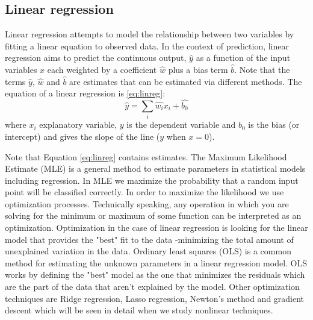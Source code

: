 \documentclass[11pt]{article}
\begin{document}
\subsection{Linear regression}
\label{sse:linreg}

Linear regression attempts to model the relationship between two variables by fitting a linear equation to observed data. In the context of prediction, linear regression aims to predict the continuous output, $\hat{y}$ as a function of the input variables $x$ each weighted by a coefficient $\hat{w}$ plus a bias term $\hat{b}$. Note that the terms $\hat{y}$, $\hat{w}$ and $\hat{b}$ are estimates that can be estimated via different methods. The equation of a linear regression is \ref{eq:linreg}:
\begin{equation}
\hat{y} = \sum_i \hat{w_i}x_i + \hat{b_0}
\label{eq:linreg}
\end{equation}
where $x_i$ explanatory variable, $y$ is the dependent variable and $b_0$ is the bias (or intercept) and gives the slope of the line ($y$ when $x=0$).

Note that Equation \ref{eq:linreg} contains estimates. The Maximum Likelihood Estimate (MLE) is a general method to estimate parameters in statistical models including regression. In MLE we maximize the probability that a random input point will be classified correctly. In order to maximize the likelihood we use optimization processes. 
Technically speaking, any operation in which you are solving for the minimum or maximum of some function can be interpreted as an optimization. Optimization in the case of linear regression is looking for the linear model that provides the "best" fit to the data -minimizing the total amount of unexplained variation in the data.
Ordinary least squares (OLS) is a common method for estimating the unknown parameters in a linear regression model. OLS 
works by defining the "best" model as the one that minimizes the residuals which are the part of the data that aren't explained by the model. Other optimization techniques are Ridge regression, Lasso regression, Newton's method and gradient descent which will be seen in detail when we study nonlinear techniques.
\end{document}
